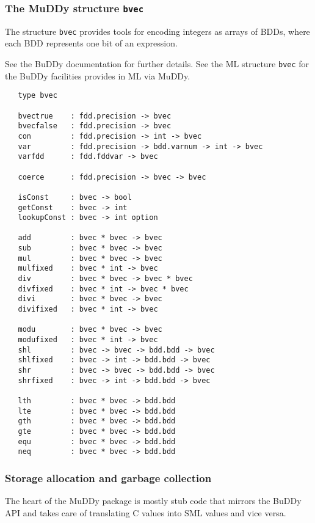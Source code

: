 \documentclass[12pt]{book}
\renewcommand{\t}[1]{\mbox{\tt #1}}
\newcommand{\Buddy}{BuDDy{}}
\newcommand{\Muddy}{MuDDy{}}
\begin{document}
\subsubsection{The \Muddy{} structure \t{bvec}}\label{bvec}

The structure \t{bvec} provides tools for encoding integers as arrays
of BDDs, where each BDD represents one bit of an expression.

See the \Buddy{} documentation \cite{BuDDy} for further details. See the ML structure \t{bvec}
for the \Buddy{} facilities provides in ML via \Muddy{}.


\begin{verbatim}
   type bvec

   bvectrue    : fdd.precision -> bvec 
   bvecfalse   : fdd.precision -> bvec 
   con         : fdd.precision -> int -> bvec
   var         : fdd.precision -> bdd.varnum -> int -> bvec
   varfdd      : fdd.fddvar -> bvec

   coerce      : fdd.precision -> bvec -> bvec

   isConst     : bvec -> bool
   getConst    : bvec -> int
   lookupConst : bvec -> int option

   add         : bvec * bvec -> bvec
   sub         : bvec * bvec -> bvec
   mul         : bvec * bvec -> bvec
   mulfixed    : bvec * int -> bvec
   div         : bvec * bvec -> bvec * bvec
   divfixed    : bvec * int -> bvec * bvec
   divi        : bvec * bvec -> bvec
   divifixed   : bvec * int -> bvec

   modu        : bvec * bvec -> bvec
   modufixed   : bvec * int -> bvec
   shl         : bvec -> bvec -> bdd.bdd -> bvec
   shlfixed    : bvec -> int -> bdd.bdd -> bvec
   shr         : bvec -> bvec -> bdd.bdd -> bvec
   shrfixed    : bvec -> int -> bdd.bdd -> bvec

   lth         : bvec * bvec -> bdd.bdd
   lte         : bvec * bvec -> bdd.bdd
   gth         : bvec * bvec -> bdd.bdd
   gte         : bvec * bvec -> bdd.bdd
   equ         : bvec * bvec -> bdd.bdd
   neq         : bvec * bvec -> bdd.bdd
\end{verbatim}

\subsubsection{Storage allocation and garbage collection}
\label{sec:technical-details}

The heart of the \Muddy{} package is mostly stub code that mirrors the
\Buddy{} API and takes care of translating C values into SML values and
vice versa.
\end{document}
